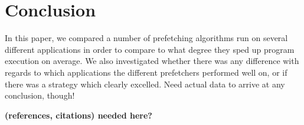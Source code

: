 
\section{Conclusion}
\label{sec:conclusion}

In this paper, we compared a number of prefetching algorithms run on
several different applications in order to compare to what degree they
sped up program execution on average. We also investigated whether
there was any difference with regards to which applications the
different prefetchers performed well on, or if there was a strategy
which clearly excelled. Need actual data to arrive at any conclusion,
though!

{\bf (references, citations) needed here?}

